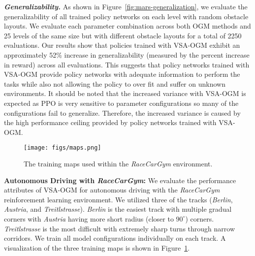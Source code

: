 \textbf{\textit{Generalizability.}} As shown in Figure~\ref{fig:mars-generalization}, we evaluate the generalizability of all trained policy networks on each level with random obstacle layouts. We evaluate each parameter combination across both OGM methods and 25 levels of the same size but with different obstacle layouts for a total of 2250 evaluations. Our results show that policies trained with VSA-OGM exhibit an approximately 52\% increase in generalizability (measured by the percent increase in reward) across all evaluations. This suggests that policy networks trained with VSA-OGM provide policy networks with adequate information to perform the tasks while also not allowing the policy to over fit and suffer on unknown environments. It should be noted that the increased variance with VSA-OGM is expected as PPO is very sensitive to parameter configurations so many of the configurations fail to generalize. Therefore, the increased variance is caused by the high performance ceiling provided by policy networks trained with VSA-OGM.

\begin{figure}
    \centering
    \texttt{[image: figs/maps.png]}
    \caption{The training maps used within the \textit{RaceCarGym} environment.}
    \label{fig:maps}
    \vspace{-10pt}
\end{figure}

\textbf{Autonomous Driving with \textit{RaceCarGym}:} We evaluate the performance attributes of VSA-OGM for autonomous driving with the \textit{RaceCarGym}~\cite{Brunnbauer_racecar_gym} reinforcement learning environment. We utilized three of the tracks (\textit{Berlin}, \textit{Austria}, and \textit{Treitlstrasse}). \textit{Berlin} is the easiest track with multiple gradual corners with \textit{Austria} having more short radius (closer to $90^\circ$) corners. \textit{Treitlstrasse} is the most difficult with extremely sharp turns through narrow corridors. We train all model configurations individually on each track. A visualization of the three training maps is shown in Figure~\ref{fig:maps}.



